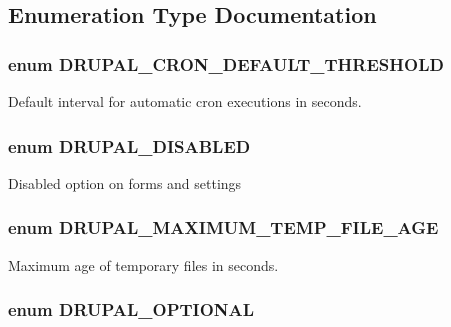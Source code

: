 \subsection{Enumeration Type Documentation}
\hypertarget{system_8module_a47326c184056858c75265eb78fea8eef}{
\subsubsection[{DRUPAL\_\-CRON\_\-DEFAULT\_\-THRESHOLD}]{\setlength{\rightskip}{0pt plus 5cm}enum {\bf DRUPAL\_\-CRON\_\-DEFAULT\_\-THRESHOLD}}}
\label{system_8module_a47326c184056858c75265eb78fea8eef}
Default interval for automatic cron executions in seconds. \hypertarget{system_8module_a84956e394d850e59a82fbc78703795f1}{
\subsubsection[{DRUPAL\_\-DISABLED}]{\setlength{\rightskip}{0pt plus 5cm}enum {\bf DRUPAL\_\-DISABLED}}}
\label{system_8module_a84956e394d850e59a82fbc78703795f1}
Disabled option on forms and settings \hypertarget{system_8module_a48adbc5ce9391dacebddd91907dbbaaf}{
\subsubsection[{DRUPAL\_\-MAXIMUM\_\-TEMP\_\-FILE\_\-AGE}]{\setlength{\rightskip}{0pt plus 5cm}enum {\bf DRUPAL\_\-MAXIMUM\_\-TEMP\_\-FILE\_\-AGE}}}
\label{system_8module_a48adbc5ce9391dacebddd91907dbbaaf}
Maximum age of temporary files in seconds. \hypertarget{system_8module_a1a7cc24228e990770cd55d79ba00e95e}{
\subsubsection[{DRUPAL\_\-OPTIONAL}]{\setlength{\rightskip}{0pt plus 5cm}enum {\bf DRUPAL\_\-OPTIONAL}}}
